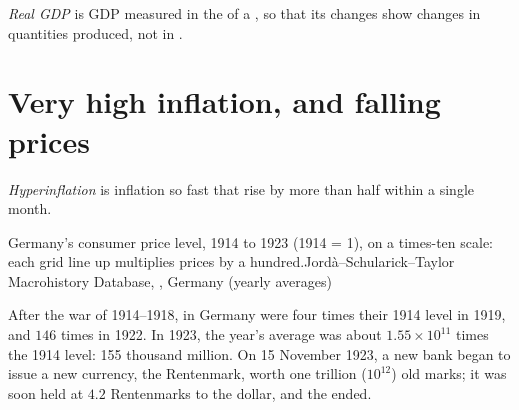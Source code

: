 \begin{definition}\label{def:g8:inflation-and-price-indices:real-gdp}
\emph{Real GDP} is GDP measured in the  of a , so that its changes
show changes in quantities produced, not in .
\end{definition}

\section{Very high inflation, and falling prices}

\begin{definition}[Hyperinflation]\label{def:g8:inflation-and-price-indices:hyperinflation}
\emph{Hyperinflation} is inflation so fast that  rise by more than
half within a single month.
\end{definition}

\begin{omchart}{Germany's consumer price level, 1914 to 1923 (1914 = 1), on a times-ten scale:
each grid line up multiplies prices by a hundred.}{Jord\`a--Schularick--Taylor Macrohistory Database,
, Germany (yearly averages)}
\end{omchart}

After the war of 1914--1918,  in Germany were four times their 1914 level in 1919, and $146$
times in 1922. In 1923, the year's average was about $1.55 \times 10^{11}$ times the 1914 level:
155 thousand million. On 15 November
1923, a new bank began to issue a new currency, the Rentenmark, worth one trillion ($10^{12}$) old
marks; it was soon held at $4.2$ Rentenmarks to the dollar, and the  ended.

